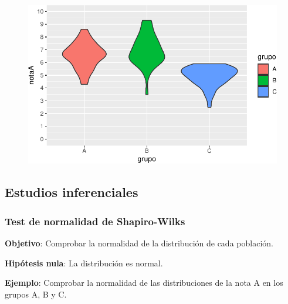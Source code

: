 \documentclass[
  a4paper,
]{scrreport}
\newenvironment{Shaded}{\begin{snugshade}}{\end{snugshade}}
\newcommand{\AttributeTok}[1]{\textcolor[rgb]{0.40,0.45,0.13}{#1}}
\newcommand{\FunctionTok}[1]{\textcolor[rgb]{0.28,0.35,0.67}{#1}}
\newcommand{\NormalTok}[1]{\textcolor[rgb]{0.00,0.23,0.31}{#1}}
\newcommand{\OtherTok}[1]{\textcolor[rgb]{0.00,0.23,0.31}{#1}}
\newcommand{\SpecialCharTok}[1]{\textcolor[rgb]{0.37,0.37,0.37}{#1}}
\newcommand{\StringTok}[1]{\textcolor[rgb]{0.13,0.47,0.30}{#1}}
\theoremstyle{definition}
\theoremstyle{definition}
\theoremstyle{remark}
\begin{document}
\begin{figure}[H]

{\centering \includegraphics{08-analisis-estadisticos_files/figure-pdf/unnamed-chunk-48-1.pdf}

}

\end{figure}

\hypertarget{estudios-inferenciales-4}{%
\subsection{Estudios inferenciales}\label{estudios-inferenciales-4}}

\hypertarget{test-de-normalidad-de-shapiro-wilks-2}{%
\subsubsection{Test de normalidad de
Shapiro-Wilks}\label{test-de-normalidad-de-shapiro-wilks-2}}

\textbf{Objetivo}: Comprobar la normalidad de la distribución de cada
población.

\textbf{Hipótesis nula}: La distribución es normal.

\textbf{Ejemplo}: Comprobar la normalidad de las distribuciones de la
nota A en los grupos A, B y C.

\begin{Shaded}
\end{Shaded}
\end{document}
